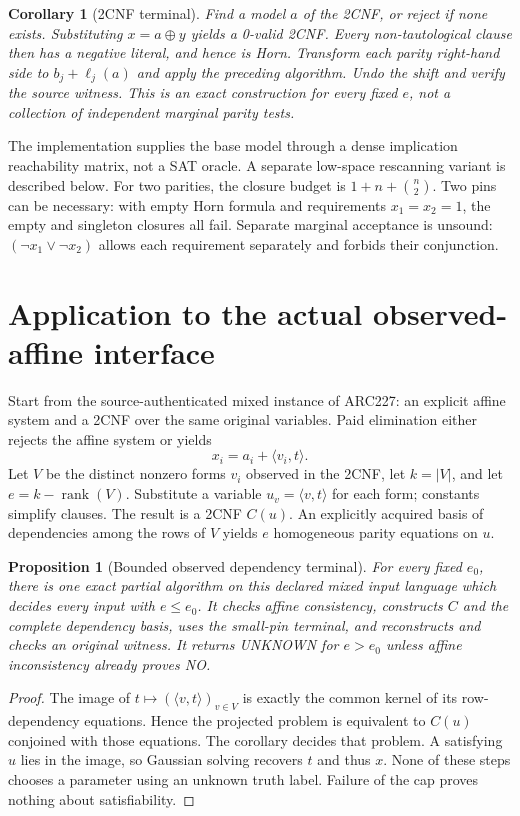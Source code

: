 \documentclass[11pt]{article}
\newtheorem{corollary}[theorem]{Corollary}
\newtheorem{proposition}[theorem]{Proposition}
\begin{document}
\begin{corollary}[2CNF terminal]
Find a model $a$ of the 2CNF, or reject if none exists. Substituting
$x=a\oplus y$ yields a 0-valid 2CNF. Every non-tautological clause then has
a negative literal, and hence is Horn. Transform each parity right-hand
side to $b_j+\ell_j(a)$ and apply the preceding algorithm. Undo the shift
and verify the source witness. This is an exact construction for every
fixed $e$, not a collection of independent marginal parity tests.
\end{corollary}

The implementation supplies the base model through a dense implication
reachability matrix, not a SAT oracle. A separate low-space rescanning
variant is described below. For two parities, the closure budget is
$1+n+\binom n2$. Two pins can be necessary: with empty Horn formula and
requirements $x_1=x_2=1$, the empty and singleton closures all fail.
Separate marginal acceptance is unsound: $(\neg x_1\vee\neg x_2)$ allows
each requirement separately and forbids their conjunction.

\section{Application to the actual observed-affine interface}
Start from the source-authenticated mixed instance of ARC227: an explicit
affine system and a 2CNF over the same original variables. Paid elimination
either rejects the affine system or yields
\[
 x_i=a_i+\langle v_i,t\rangle.
\]
Let $V$ be the distinct nonzero forms $v_i$ observed in the 2CNF, let
$k=|V|$, and let $e=k-\operatorname{rank}(V)$. Substitute a variable
$u_v=\langle v,t\rangle$ for each form; constants simplify clauses. The
result is a 2CNF $C(u)$. An explicitly acquired basis of dependencies among
the rows of $V$ yields $e$ homogeneous parity equations on $u$.

\begin{proposition}[Bounded observed dependency terminal]
For every fixed $e_0$, there is one exact partial algorithm on this declared
mixed input language which decides every input with $e\le e_0$. It checks
affine consistency, constructs $C$ and the complete dependency basis, uses
the small-pin terminal, and reconstructs and checks an original witness.
It returns UNKNOWN for $e>e_0$ unless affine inconsistency already proves NO.
\end{proposition}
\begin{proof}
The image of $t\mapsto(\langle v,t\rangle)_{v\in V}$ is exactly the common
kernel of its row-dependency equations. Hence the projected problem is
equivalent to $C(u)$ conjoined with those equations. The corollary decides
that problem. A satisfying $u$ lies in the image, so Gaussian solving
recovers $t$ and thus $x$. None of these steps chooses a parameter using an
unknown truth label. Failure of the cap proves nothing about satisfiability.
\end{proof}
\end{document}
